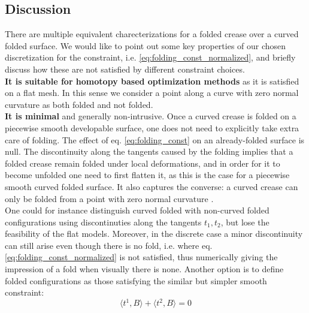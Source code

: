 
\subsection{Discussion}
There are multiple equivalent charecterizations for a folded crease over a curved folded surface. We would like to point out some key properties of our chosen discretization for the constraint, i.e. \eqref{eq:folding_const_normalized}, and briefly discuss how these are not satisfied by different constraint choices. \\
\textbf{It is suitable for homotopy based optimization methods} as it is satisfied on a flat mesh. In this sense we consider a point along a curve with zero normal curvature as both folded and not folded. \\ 
\textbf{It is minimal} and generally non-intrusive. Once a curved crease is folded on a piecewise smooth developable surface, one does not need to explicitly take extra care of folding. The effect of eq. \eqref{eq:folding_const} on an already-folded surface is null. The discontinuity along the tangents caused by the folding implies that a folded crease remain folded under local deformations, and in order for it to become unfolded one need to first flatten it, as this is the case for a piecewise smooth curved folded surface. It also captures the converse: a curved crease can only be folded from a point with zero normal curvature \cite{more_on_paper}. \\
One could for instance distinguish curved folded with non-curved folded configurations using discontinuties along the tangents $t_1,t_2$, but lose the feasibility of the flat models. Moreover, in the discrete case a minor discontinuity can still arise even though there is no fold, i.e. where eq. \eqref{eq:folding_const_normalized} is not satisfied, thus numerically giving the impression of a fold when visually there is none. Another option is to define folded configurations as those satisfying the similar but simpler smooth constraint:
\begin{equation} \label{eq:folding_const_smooth} 
\langle t^1,B\rangle + \langle t^2,B\rangle = 0
\end{equation}
